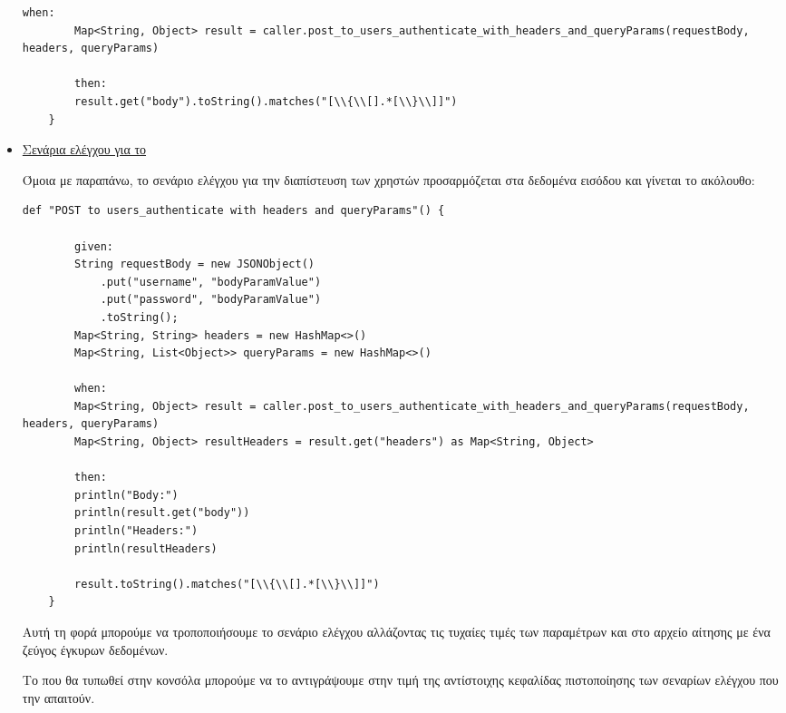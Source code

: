 \begin{itemize}
\begin{lstlisting}[deletekeywords={api,body}]
        when:
        Map<String, Object> result = caller.post_to_users_authenticate_with_headers_and_queryParams(requestBody, headers, queryParams)
        
        then:
        result.get("body").toString().matches("[\\{\\[].*[\\}\\]]")
    }
\end{lstlisting}

    \item \underline{Σενάρια ελέγχου για το }
    
    Όμοια με παραπάνω,
    το σενάριο ελέγχου για την διαπίστευση των χρηστών προσαρμόζεται στα δεδομένα εισόδου 
    και γίνεται το ακόλουθο:

    \begin{lstlisting}[deletekeywords={body}]
    def "POST to users_authenticate with headers and queryParams"() {

        given:
        String requestBody = new JSONObject()
            .put("username", "bodyParamValue")
            .put("password", "bodyParamValue")
            .toString();
        Map<String, String> headers = new HashMap<>()
        Map<String, List<Object>> queryParams = new HashMap<>()

        when:
        Map<String, Object> result = caller.post_to_users_authenticate_with_headers_and_queryParams(requestBody, headers, queryParams)
        Map<String, Object> resultHeaders = result.get("headers") as Map<String, Object>

        then:
        println("Body:")
        println(result.get("body"))
        println("Headers:")
        println(resultHeaders)

        result.toString().matches("[\\{\\[].*[\\}\\]]")
    }
\end{lstlisting}

    Αυτή τη φορά μπορούμε να τροποποιήσουμε το σενάριο ελέγχου 
    αλλάζοντας τις τυχαίες τιμές των παραμέτρων  και  στο  αρχείο αίτησης
    με ένα ζεύγος έγκυρων δεδομένων.
    
    Το  που θα τυπωθεί στην κονσόλα μπορούμε να το αντιγράψουμε 
    στην τιμή της αντίστοιχης κεφαλίδας πιστοποίησης των σεναρίων ελέγχου που την απαιτούν.
    

\end{itemize}
